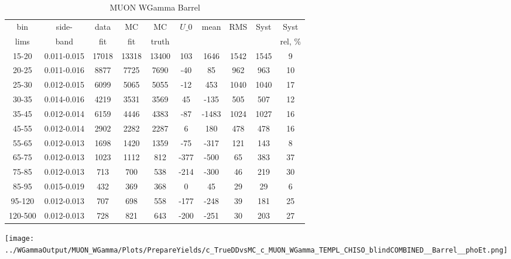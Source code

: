 \documentclass{beamer}
\begin{document}
\begin{frame}
{
\begin{table}[h]
  	\tiny
  \begin{center}
  \caption{MUON WGamma Barrel}
  \begin{tabular}{|c|c|c|c|c|c|c|c|c|c|}
    bin & side- & data & MC & MC    & $U\_{0}$ & mean & RMS & Syst & Syst \\ 
    lims & band & fit & fit & truth &       &      &     &      & rel, \% \\ \hline
    15-20 & 0.011-0.015 & 17018 & 13318 & 13400 & 103 & 1646 & 1542 & 1545 & 9  \\ \hline
    20-25 & 0.011-0.016 & 8877 & 7725 & 7690 & -40 & 85 & 962 & 963 & 10  \\ \hline
    25-30 & 0.012-0.015 & 6099 & 5065 & 5055 & -12 & 453 & 1040 & 1040 & 17  \\ \hline
    30-35 & 0.014-0.016 & 4219 & 3531 & 3569 & 45 & -135 & 505 & 507 & 12  \\ \hline
    35-45 & 0.012-0.014 & 6159 & 4446 & 4383 & -87 & -1483 & 1024 & 1027 & 16  \\ \hline
    45-55 & 0.012-0.014 & 2902 & 2282 & 2287 & 6 & 180 & 478 & 478 & 16  \\ \hline
    55-65 & 0.012-0.013 & 1698 & 1420 & 1359 & -75 & -317 & 121 & 143 & 8  \\ \hline
    65-75 & 0.012-0.013 & 1023 & 1112 & 812 & -377 & -500 & 65 & 383 & 37  \\ \hline
    75-85 & 0.012-0.013 & 713 & 700 & 538 & -214 & -300 & 46 & 219 & 30  \\ \hline
    85-95 & 0.015-0.019 & 432 & 369 & 368 & 0 & 45 & 29 & 29 & 6  \\ \hline
    95-120 & 0.012-0.013 & 707 & 698 & 558 & -177 & -248 & 39 & 181 & 25  \\ \hline
    120-500 & 0.012-0.013 & 728 & 821 & 643 & -200 & -251 & 30 & 203 & 27  \\ \hline
  \end{tabular}
  \label{tab:systSbVar_Meth1_MUON_WGamma_Barrel}
  \end{center}
\end{table}

\texttt{[image: ../WGammaOutput/MUON\_WGamma/Plots/PrepareYields/c\_TrueDDvsMC\_c\_MUON\_WGamma\_TEMPL\_CHISO\_blindCOMBINED\_\_Barrel\_\_phoEt.png]} 

}
\end{frame}
\end{document}
